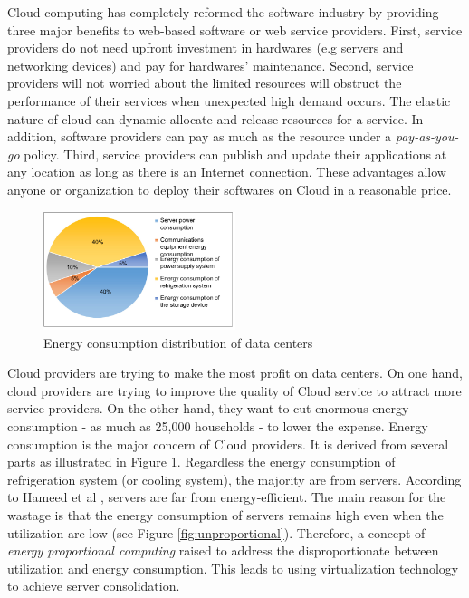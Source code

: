 Cloud computing has completely reformed the software industry \cite{Buyya:2009ix} by providing three major benefits to web-based software or web service providers.
First, service providers do not need upfront investment in hardwares (e.g servers and networking devices) and pay for hardwares' maintenance. 
Second, service providers will not worried about the limited resources will obstruct the performance of their services when unexpected high demand occurs. The elastic nature of cloud can dynamic allocate and release resources for a service. In addition, software providers can pay as much as the resource under a \emph{pay-as-you-go} policy.
Third, service providers can publish and update their applications at any location 
as long as there is an Internet connection. 
These advantages allow anyone or organization to deploy their softwares on Cloud in
a reasonable price. 

\begin{figure}
	\centering
	\includegraphics[width=0.5\textwidth]{pics/energyConsumption.png}
	\caption{Energy consumption distribution of data centers \cite{Rong:2016js}}
	\label{fig:consumption}
\end{figure} 

Cloud providers are trying to make the most profit on data centers.
On one hand, cloud providers are trying to improve the quality of  Cloud service to attract more service providers.
On the other hand, they want to cut enormous energy consumption 
- as much as 25,000 households \cite{Kaplan:up01fR-k} - to lower the expense. Energy consumption is the major concern of Cloud providers. It is derived from several parts as 
illustrated in Figure \ref{fig:consumption}. 
Regardless the energy consumption of refrigeration system (or cooling system), 
the majority are from servers.
According to Hameed et al \cite{Hameed:2016cma}, servers are far from energy-efficient. 
The main reason for the wastage is that the energy consumption of servers remains high even when the utilization are low (see Figure \ref{fig:unproportional}). 
Therefore, a concept of
\emph{energy proportional computing} \cite{Barroso:2007jt} raised to address the disproportionate between utilization and energy consumption. This leads to 
using virtualization technology to achieve server consolidation.

